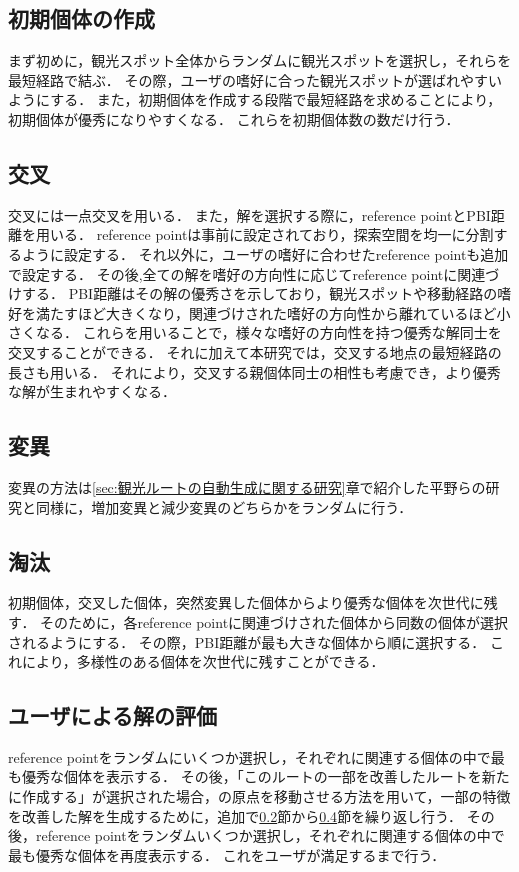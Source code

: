 \subsection{初期個体の作成}\label{sec:初期解の作成}
まず初めに，観光スポット全体からランダムに観光スポットを選択し，それらを最短経路で結ぶ．
その際，ユーザの嗜好に合った観光スポットが選ばれやすいようにする．
また，初期個体を作成する段階で最短経路を求めることにより，初期個体が優秀になりやすくなる．
これらを初期個体数の数だけ行う．
\subsection{交叉}\label{sec:交叉}
交叉には一点交叉を用いる．
また，解を選択する際に，reference pointとPBI距離を用いる．
reference pointは事前に設定されており，探索空間を均一に分割するように設定する．
それ以外に，ユーザの嗜好に合わせたreference pointも追加で設定する．
その後,全ての解を嗜好の方向性に応じてreference pointに関連づけする．
PBI距離はその解の優秀さを示しており，観光スポットや移動経路の嗜好を満たすほど大きくなり，関連づけされた嗜好の方向性から離れているほど小さくなる．
これらを用いることで，様々な嗜好の方向性を持つ優秀な解同士を交叉することができる．
それに加えて本研究では，交叉する地点の最短経路の長さも用いる．
それにより，交叉する親個体同士の相性も考慮でき，より優秀な解が生まれやすくなる．
\subsection{変異}\label{sec:変異}
変異の方法は\ref{sec:観光ルートの自動生成に関する研究}章で紹介した平野らの研究\cite{平野}と同様に，増加変異と減少変異のどちらかをランダムに行う．
\subsection{淘汰}\label{sec:淘汰}
初期個体，交叉した個体，突然変異した個体からより優秀な個体を次世代に残す．
そのために，各reference pointに関連づけされた個体から同数の個体が選択されるようにする．
その際，PBI距離が最も大きな個体から順に選択する．
これにより，多様性のある個体を次世代に残すことができる．
\subsection{ユーザによる解の評価}\label{sec:ユーザによる解の評価}
reference pointをランダムにいくつか選択し，それぞれに関連する個体の中で最も優秀な個体を表示する．
その後，「このルートの一部を改善したルートを新たに作成する」が選択された場合，\cite{岸上}の原点を移動させる方法を用いて，一部の特徴を改善した解を生成するために，追加で\ref{sec:交叉}節から\ref{sec:淘汰}節を繰り返し行う．
その後，reference pointをランダムいくつか選択し，それぞれに関連する個体の中で最も優秀な個体を再度表示する．
これをユーザが満足するまで行う．

